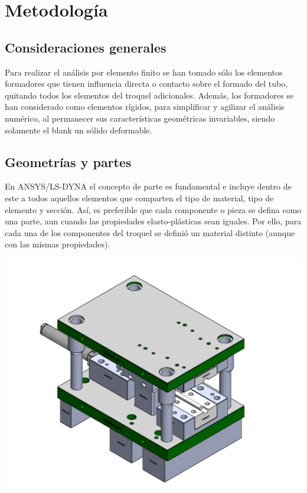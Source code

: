 \chapter{Metodología}

\section{Consideraciones generales}

Para realizar el análisis por elemento finito se han tomado sólo los elementos formadores que 
tienen influencia directa o contacto sobre el formado del tubo, quitando todos los elementos 
del troquel adicionales. Además, los formadores se han considerado como elementos rígidos, 
para simplificar y agilizar el análisis numérico, al permanecer sus características geométricas 
invariables, siendo solamente el blank un sólido deformable.

\section{Geometrías y partes}

En ANSYS/LS-DYNA el concepto de parte es fundamental e incluye dentro de este a todos aquellos 
elementos que comparten el tipo de material, tipo de elemento y sección. Así, es preferible que 
cada componente o pieza se defina como una parte, aun cuando las propiedades elasto-plásticas 
sean iguales. Por ello, para cada una de los componentes del troquel se definió un material 
distinto (aunque con las mismas propiedades).

\begin{center}
\includegraphics[scale=0.55]{src/ch3/troquel}
\label{fig:all_tool}
\end{center}

